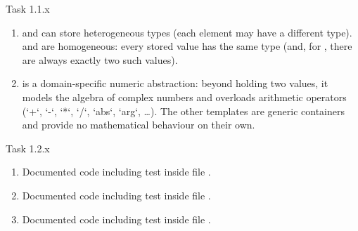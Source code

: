 \begin{problem}{}{Task 1.1.x}
\begin{enumerate}[(1)]
        \item  
             and  can store
            heterogeneous types (each element may have a different
            type).  
             and 
            are homogeneous: every stored value has the same type
             (and, for , there are always
            exactly two such values).

        \item  
             is a domain-specific numeric
            abstraction: beyond holding two values, it models the algebra
            of complex numbers and overloads arithmetic operators
            (`+`, `-`, `*`, `/`, `abs`, `arg`, …).
            The other templates are generic containers and provide no
            mathematical behaviour on their own.
    \end{enumerate}
\end{problem}

\begin{problem}{}{Task 1.2.x}
    \begin{enumerate}[(1)]
        \item Documented code including test inside file .
        \item Documented code including test inside file .
        \item Documented code including test inside file .
    \end{enumerate}
\end{problem}

